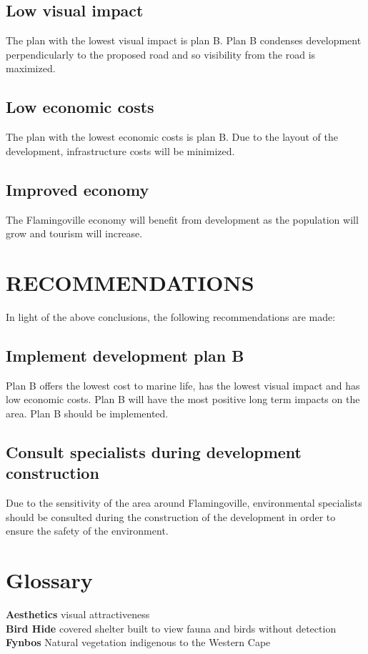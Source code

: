 \documentclass{article}
\begin{document}
\subsection{Low visual impact}
The plan with the lowest visual impact is plan B. Plan B condenses development perpendicularly to the proposed road and so visibility from the road is maximized.

\subsection{Low economic costs}
The plan with the lowest economic costs is plan B. Due to the layout of the development, infrastructure costs will be minimized.

\subsection{Improved economy}
The Flamingoville economy will benefit from development as the population will grow and tourism will increase.  

\newpage
\section{RECOMMENDATIONS}
In light of the above conclusions, the following recommendations are made:

\subsection{Implement development plan B}
Plan B offers the lowest cost to marine life, has the lowest visual impact and has low economic costs. Plan B will have the most positive long term impacts on the area. Plan B should be implemented.

\subsection{Consult specialists during development construction}
Due to the sensitivity of the area around Flamingoville, environmental specialists should be consulted during the construction of the development in order to ensure the safety of the environment.

\newpage
\listoffigures

\newpage
\section*{Glossary}
\textbf{Aesthetics} \quad visual attractiveness\\
\textbf{Bird Hide} \quad covered shelter built to view fauna and birds without detection\\
\textbf{Fynbos} \quad Natural vegetation indigenous to the Western Cape

\newpage
\printbibliography
\end{document}
